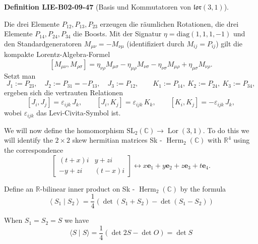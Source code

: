 \documentclass[10pt, letterpaper]{article}
\newcommand{\CustomHeading}[3]{%
  \par\medskip\noindent%
  \textbf{#1 #2} \textnormal{(#3)}.\enskip%
}
\newenvironment{DEF}[2]{\begin{unitbox}\CustomHeading{Definition}{#1}{#2}}{\end{unitbox}}
\begin{document}
\begin{DEF}{LIE-B02-09-47}{Basis und Kommutatoren von \(\mathfrak{lor}(3,1)\)}
Die drei Elemente \(P_{12},P_{13},P_{23}\) erzeugen die räumlichen Rotationen,
die drei Elemente \(P_{14},P_{24},P_{34}\) die Boosts. Mit der Signatur
\(\eta=\mathrm{diag}(1,1,1,-1)\) und den Standardgeneratoren
\(M_{\mu\nu}=-M_{\nu\mu}\) (identifiziert durch \(M_{ij}=P_{ij}\)) gilt die
kompakte Lorentz-Algebra-Formel
\[
[M_{\mu\nu},M_{\rho\sigma}]
=\eta_{\nu\rho}M_{\mu\sigma}-\eta_{\mu\rho}M_{\nu\sigma}
-\eta_{\nu\sigma}M_{\mu\rho}+\eta_{\mu\sigma}M_{\nu\rho}.
\]
Setzt man
\[
J_1:=P_{23},\quad J_2:=P_{31}=-P_{13},\quad J_3:=P_{12},\qquad
K_1:=P_{14},\ K_2:=P_{24},\ K_3:=P_{34},
\]
ergeben sich die vertrauten Relationen
\[
[J_i,J_j]=\varepsilon_{ijk}\,J_k,\qquad
[J_i,K_j]=\varepsilon_{ijk}\,K_k,\qquad
[K_i,K_j]=-\varepsilon_{ijk}\,J_k,
\]
wobei \(\varepsilon_{ijk}\) das Levi-Civita-Symbol ist.
\end{DEF}




We will now define the homomorphism $\mathrm{SL}_{2}(\mathbb{C}) \longrightarrow \operatorname{Lor}(3,1)$. To do this we will identify the $2 \times 2$ skew hermitian matrices Sk - $\operatorname{Herm}_{2}(\mathbb{C})$ with $\mathbb{R}^{4}$ using the correspondence
$$
\left[\begin{array}{cc}
(t+x) i & y+z i \\
-y+z i & (t-x) i
\end{array}\right] \longleftrightarrow x \mathbf{e}_{1}+y \mathbf{e}_{2}+z \mathbf{e}_{3}+t \mathbf{e}_{4} .
$$

Define an $\mathbb{R}$-bilinear inner product on Sk - $\operatorname{Herm}_{2}(\mathbb{C})$ by the formula
$$
\left\langle S_{1} \mid S_{2}\right\rangle=\frac{1}{4}\left(\operatorname{det}\left(S_{1}+S_{2}\right)-\operatorname{det}\left(S_{1}-S_{2}\right)\right)
$$

When $S_{1}=S_{2}=S$ we have
$$
\langle S \mid S\rangle=\frac{1}{4}(\operatorname{det} 2 S-\operatorname{det} O)=\operatorname{det} S
$$
\end{document}
